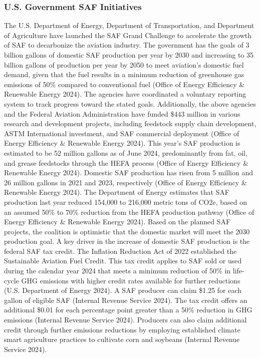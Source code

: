 \documentclass[12pt]{article}
\begin{document}
\subsubsection{U.S. Government SAF Initiatives }

The U.S. Department of Energy, Department of Transportation, and Department of Agriculture have launched the SAF Grand Challenge to accelerate the growth of SAF to decarbonize the aviation industry. The government has the goals of 3 billion gallons of domestic SAF production per year by 2030 and increasing to 35 billion gallons of production per year by 2050 to meet aviation’s domestic fuel demand, given that the fuel results in a minimum reduction of greenhouse gas emissions of 50\% compared to conventional fuel (Office of Energy Efficiency \& Renewable Energy 2024). The agencies have coordinated a voluntary reporting system to track progress toward the stated goals. Additionally, the above agencies and the Federal Aviation Administration have funded \$443 million in various research and development projects, including feedstock supply chain development, ASTM International investment, and SAF commercial deployment (Office of Energy Efficiency \& Renewable Energy 2024). 
This year’s SAF production is estimated to be 52 million gallons as of June 2024, predominantly from fat, oil, and grease feedstocks through the HEFA process (Office of Energy Efficiency \& Renewable Energy 2024). Domestic SAF production has risen from 5 million and 26 million gallons in 2021 and 2023, respectively (Office of Energy Efficiency \& Renewable Energy 2024). The Department of Energy estimates that SAF production last year reduced 154,000 to 216,000 metric tons of CO2e, based on an assumed 50\% to 70\% reduction from the HEFA production pathway (Office of Energy Efficiency \& Renewable Energy 2024). Based on the planned SAF projects, the coalition is optimistic that the domestic market will meet the 2030 production goal. 
A key driver in the increase of domestic SAF production is the federal SAF tax credit. The Inflation Reduction Act of 2022 established the Sustainable Aviation Fuel Credit. This tax credit applies to SAF sold or used during the calendar year 2024 that meets a minimum reduction of 50\% in life-cycle GHG emissions with higher credit rates available for further reductions (U.S. Department of Energy 2024). A SAF producer can claim \$1.25 for each gallon of eligible SAF (Internal Revenue Service 2024). The tax credit offers an additional \$0.01 for each percentage point greater than a 50\% reduction in GHG emissions (Internal Revenue Service 2024). Producers can also claim additional credit through further emissions reductions by employing established climate smart agriculture practices to cultivate corn and soybeans (Internal Revenue Service 2024). 
\end{document}
